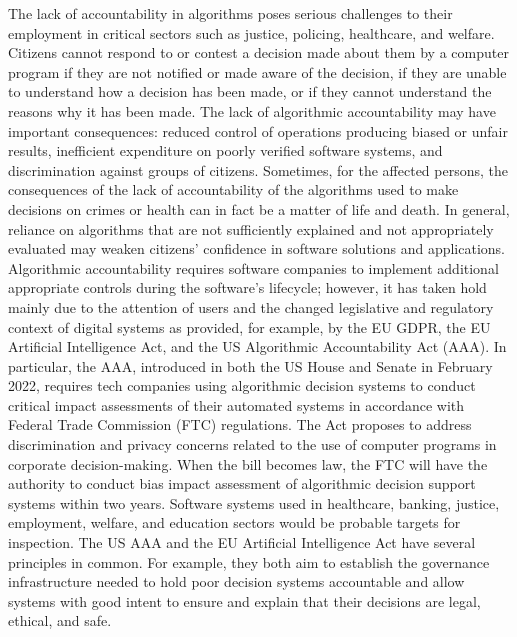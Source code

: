 The lack of accountability in algorithms poses serious challenges to their employment in critical sectors such as justice, policing, healthcare, and welfare. Citizens cannot respond to or contest a decision made about them by a computer program if they are not notified or made aware of the decision, if they are unable to understand how a decision has been made, or if they cannot understand the reasons why it has been made. The lack of algorithmic accountability may have important consequences: reduced control of operations producing biased or unfair results, inefficient expenditure on poorly verified software systems, and discrimination against groups of citizens. Sometimes, for the affected persons, the consequences of the lack of accountability of the algorithms used to make decisions on crimes or health can in fact be a matter of life and death. In general, reliance on algorithms that are not sufficiently explained and not appropriately evaluated may weaken citizens' confidence in software solutions and applications. Algorithmic accountability requires software companies to implement additional appropriate controls during the software's lifecycle; however, it has taken hold mainly due to the attention of users and the changed legislative and regulatory context of digital systems as provided, for example, by the EU GDPR, the EU Artificial Intelligence Act, and the US Algorithmic Accountability Act (AAA). In particular, the AAA, introduced in both the US House and Senate in February 2022, requires tech companies using algorithmic decision systems to conduct critical impact assessments of their automated systems in accordance with Federal Trade Commission (FTC) regulations. The Act proposes to address discrimination and privacy concerns related to the use of computer programs in corporate decision-making. When the bill becomes law, the FTC will have the authority to conduct bias impact assessment of algorithmic decision support systems within two years. Software systems used in healthcare, banking, justice, employment, welfare, and education sectors would be probable targets for inspection. The US AAA and the EU Artificial Intelligence Act have several principles in common. For example, they both aim to establish the governance infrastructure needed to hold poor decision systems accountable and allow systems with good intent to ensure and explain that their decisions are legal, ethical, and safe.

